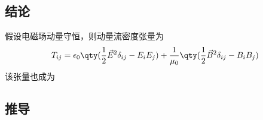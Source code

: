 
\subsection{结论}

假设电磁场动量守恒，则动量流密度张量为
\begin{equation}
T_{ij} = \epsilon_0 \qty(\frac12 \vec E^2 \delta_{ij} - E_i E_j) + \frac{1}{\mu_0} \qty(\frac12 \vec B^2 \delta_{ij} - B_i B_j)
\end{equation} 
该张量也成为

\subsection{推导}	

